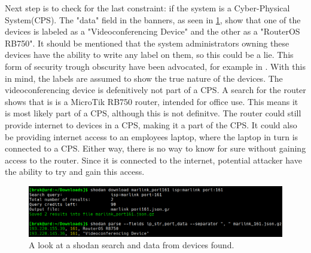 Next step is to check for the last constraint: if the system is a Cyber-Physical System(CPS). The "data" field in the banners, as seen in \cref{fig:marlink_traceroute_data}, show that one of the devices is labeled as a "Videoconferencing Device" and the other as a "RouterOS RB750". It should be mentioned that the system administrators owning these devices have the ability to write any label on them, so this could be a lie. This form of security trough obscurity have been advocated, for example in \cite{bodenheim_butts_dunlap_mullins_2014}. With this in mind, the labels are assumed to show the true nature of the devices. 
The videoconferencing device is defenitively not part of a CPS. 
A search for the router shows that is is a MicroTik RB750 router, intended for office use.\cite{RB750} This means it is most likely part of a CPS, although this is not definitve. The router could still provide internet to devices in a CPS, making it a part of the CPS. It could also be providing internet access to an employees laptop, where the laptop in turn is connected to a CPS. Either way, there is no way to know for sure without gaining access to the router. Since it is connected to the internet, potential attacker have the ability to try and gain this access.

\begin{figure} [H]
    \centering
    \includegraphics[scale=0.4]{Figurer/marlink_161_data.png}
    \caption{A look at a shodan search and data from devices found.}
    \label{fig:marlink_traceroute_data}
\end{figure}

\newpage
